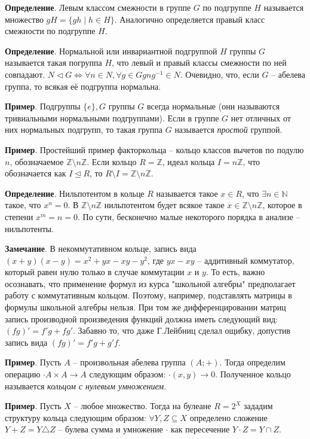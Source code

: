 \documentclass[a4paper]{book}
\begin{document}
\textbf{Определение}. Левым классом смежности в группе $G$ по подгруппе $H$ называется множество $gH = \{gh\mid h\in H\}$. Аналогично определяется правый класс смежности по подгруппе $H$.

\textbf{Определение}. Нормальной или инвариантной подгруппой $H$ группы $G$ называется такая погруппа $H$, что левый и правый классы смежности по ней совпадают. $N \triangleleft G \Leftrightarrow \forall n\in N, \forall g\in G gng^{-1}\in N$. Очевидно, что, если $G$ -- абелева группа, то всякая её подгруппа нормальна. 

\textbf{Пример}. Подгруппы $\{e\}, G$ группы $G$ всегда нормальные (они называются тривиальными нормальными подгруппами). Если в группе $G$ нет отличных от них нормальных подгрупп, то такая группа $G$ называется \textit{простой} группой. 

\textbf{Пример}. Простейший пример факторкольца -- кольцо классов вычетов по подулю $n$, обозначаемое $\mathbb{Z}\setminus n\mathbb{Z}$. Если кольцо $R = \mathbb{Z}$, идеал кольца $I =  n\mathbb{Z}$, что обозначается как $I \unlhd R$, то $R\setminus I = \mathbb{Z}\setminus n\mathbb{Z}$. 

\textbf{Определение}. Нильпотентом в кольце $R$ называется такое $x\in R$, что $\exists n\in \mathbb{N}$ такое, что $x^n = 0$. В $\mathbb{Z}\setminus n\mathbb{Z}$ нильпотентом будет всякое такое $x\in \mathbb{Z}\setminus n\mathbb{Z}$, которое в степени $x^m = n = 0$. По сути, бесконечно малые некоторого порядка в анализе -- нильпотенты. 

\textbf{Замечание}. В некоммутативном кольце, запись вида $(x+y)(x-y)=x^2+yx-xy-y^2$, где $yx-xy$ -- аддитивный коммутатор, который равен нулю только в случае коммутации $x$ и $y$. То есть, важно осознавать, что применение формул из курса "школьной алгебры" предполагает работу с коммутативным кольцом. Поэтому, например, подставлять матрицы в формулы школьной алгебры нельзя. При том же дифференцировании матриц запись производной произведения функций должна иметь следующий вид: $(fg)'= f'g+fg'$. Забавно то, что даже Г.Лейбниц сделал ощибку, допустив запись вида $(fg)'= f'g+g'f$. 

\textbf{Пример}. Пусть $A$ -- произвольная абелева группа $(A;+)$. Тогда определим операцию $\cdot A\times A\rightarrow A$ следующим образом: $\cdot (x,y) \rightarrow 0$. Полученное кольцо называется \textit{кольцом с нулевым умножением}. 

\textbf{Пример}. Пусть $X$ -- любое множество. Тогда на булеане $R = 2^X$ зададим структуру кольца следующим образом: $\forall Y,Z \subseteq X$ определено сложение $Y+Z = Y\triangle Z$ -- булева сумма и умножение $\cdot$ как пересечение $Y\cdot Z = Y \cap Z$. 
\end{document}
